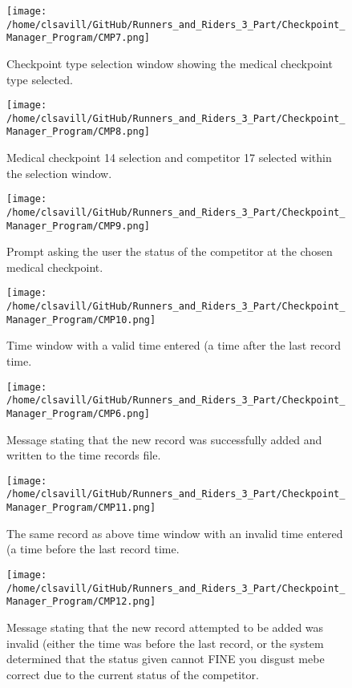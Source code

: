 \documentclass[a4paper,12pt]{article}
\begin{document}
\begin{figure}[H]
\texttt{[image: /home/clsavill/GitHub/Runners\_and\_Riders\_3\_Part/Checkpoint\_Manager\_Program/CMP7.png]}
\caption{Checkpoint type selection window showing the medical checkpoint type selected.}
\end{figure}

\begin{figure}[H]
\texttt{[image: /home/clsavill/GitHub/Runners\_and\_Riders\_3\_Part/Checkpoint\_Manager\_Program/CMP8.png]}
\caption{Medical checkpoint 14 selection and competitor 17 selected within the selection window.}
\end{figure}

\begin{figure}[H]
\texttt{[image: /home/clsavill/GitHub/Runners\_and\_Riders\_3\_Part/Checkpoint\_Manager\_Program/CMP9.png]}
\caption{Prompt asking the user the status of the competitor at the chosen medical checkpoint.}
\end{figure}

\begin{figure}[H]
\texttt{[image: /home/clsavill/GitHub/Runners\_and\_Riders\_3\_Part/Checkpoint\_Manager\_Program/CMP10.png]}
\caption{Time window with a valid time entered (a time after the last record time.}
\end{figure}

\begin{figure}[H]
\texttt{[image: /home/clsavill/GitHub/Runners\_and\_Riders\_3\_Part/Checkpoint\_Manager\_Program/CMP6.png]}
\caption{Message stating that the new record was successfully added and written to the time records file.}
\end{figure}

\begin{figure}[H]
\texttt{[image: /home/clsavill/GitHub/Runners\_and\_Riders\_3\_Part/Checkpoint\_Manager\_Program/CMP11.png]}
\caption{The same record as above time window with an invalid time entered (a time before the last record time.}
\end{figure}

\begin{figure}[H]
\texttt{[image: /home/clsavill/GitHub/Runners\_and\_Riders\_3\_Part/Checkpoint\_Manager\_Program/CMP12.png]}
\caption{Message stating that the new record attempted to be added was invalid (either the time was before the last record, or the system determined that the status given cannot FINE
you disgust mebe correct due to the current status of the competitor.}
\end{figure}
\end{document}
